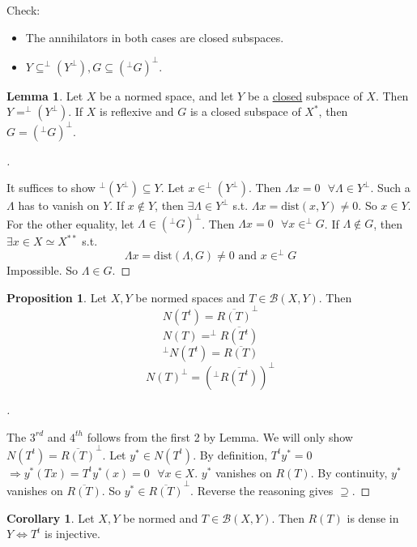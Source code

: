 \documentclass{article}
\newcommand{\sfa}{\text{  } \forall}
\theoremstyle{definition}
\newtheorem{lem}{Lemma}
\newtheorem{cor}{Corollary}
\newtheorem{prop}{Proposition}
\newenvironment{proofs}[1][\proofname]{%
  \begin{proof}[#1]$ $\par\nobreak\ignorespaces
}{%
  \end{proof}
}
\begin{document}
Check: 
\begin{itemize}
	\item The annihilators in both cases are closed subspaces.	

	\item $Y \subseteq ^\perp (Y^\perp), G \subseteq (^\perp G)^\perp$.
\end{itemize}

\begin{lem}
	Let $X$ be a normed space, and let $Y$ be a \underline{closed} subspace of $X$.
	Then $Y = ^\perp(Y^\perp)$.
	If $X$ is reflexive and $G$ is a closed subspace of $X^*$, then $G = (^\perp G)^\perp$.
\end{lem}

\begin{proofs}
	It suffices to show $^\perp(Y^\perp) \subseteq Y$.
	Let $x \in ^\perp(Y^\perp)$.
	Then $\Lambda x = 0 \sfa \Lambda \in Y^\perp$.
	Such a $\Lambda$ has to vanish on $Y$.
	If $x \notin Y$, then $\exists \Lambda \in Y^\perp$ s.t. $\Lambda x = \text{dist}(x, Y) \neq 0$.
	So $x \in Y$.
	For the other equality, let $\Lambda \in (^\perp G)^\perp$.
	Then $\Lambda x = 0 \sfa x \in ^\perp G$.
	If $\Lambda \notin G$, then $\exists x \in X \simeq X^{**}$ s.t. 
	\[
		\Lambda x = \text{dist} (\Lambda, G) \neq 0 \text{ and } x \in ^\perp G
	\]
	Impossible.
	So $\Lambda \in G$.
\end{proofs}

\begin{prop}
	Let $X, Y$ be normed spaces and $T \in \mathcal{B}(X, Y)$.
	Then 
	\[
		N(T^t) = \overline{R(T)}^\perp
	\]
	\[
		N(T) = ^\perp \overline{R(T^t)}
	\]
	\[
		^\perp N(T^t) = \overline{R(T)}
	\]
	\[
		N(T)^\perp = (^\perp \overline{R(T^t)})^\perp
	\]
\end{prop}

\begin{proofs}
	The $3^{rd}$ and $4^{th}$ follows from the first 2 by Lemma.
	We will only show $N(T^t) = \overline{R(T)}^\perp$.
	Let $y^* \in N(T^t)$.
	By definition, $T^t y^* = 0$
	$\Rightarrow y^*(T x) = T^t y^*(x) = 0 \sfa x \in X$.
	$y^*$ vanishes on $R(T)$.
	By continuity, $y^*$ vanishes on $\overline{R(T)}$.
	So $y^* \in \overline{R(T)}^\perp$.
	Reverse the reasoning gives $\supseteq$.
\end{proofs}

\begin{cor}
	Let $X, Y$ be normed and $T \in \mathcal{B}(X, Y)$.
	Then $R(T)$ is dense in $Y \Leftrightarrow T^t$ is injective.
\end{cor}
\end{document}

